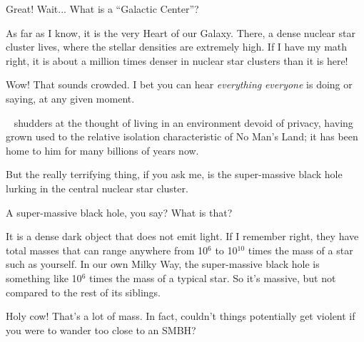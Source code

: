 \documentclass[main.tex]{subfiles}
\begin{document}
\par \Dardanus  Great!  Wait... What is a ``Galactic Center''?

\par \Electra  As far as I know, it is the very Heart of our Galaxy.  There, a dense nuclear star cluster lives, where the stellar densities are extremely high.  If I have my math right, it is about a million times denser in nuclear star clusters than it is here!

\par \Dardanus  Wow!  That sounds crowded.  I bet you can hear \textit{everything} \textit{everyone} is doing or saying, at any given moment.  

\par \nar \rmdardanus~ shudders at the thought of living in an environment devoid of privacy, having grown used to the relative isolation characteristic of No Man's Land; it has been home to him for many billions of years now.

\par \Electra But the really terrifying thing, if you ask me, is the super-massive black hole lurking in the central nuclear star cluster.

\par \Dardanus A super-massive black hole, you say?  What is that?

\par \Electra It is a dense dark object that does not emit light.  If I remember right, they have total masses that can range anywhere from 10$^6$ to 10$^{10}$ times the mass of a star such as yourself.  In our own Milky Way, the super-massive black hole is something like 10$^6$ times the mass of a typical star.  So it's massive, but not compared to the rest of its siblings.

\par \Dardanus Holy cow!  That's a lot of mass.  In fact, couldn't things potentially get violent if you were to wander too close to an SMBH?
\end{document}
